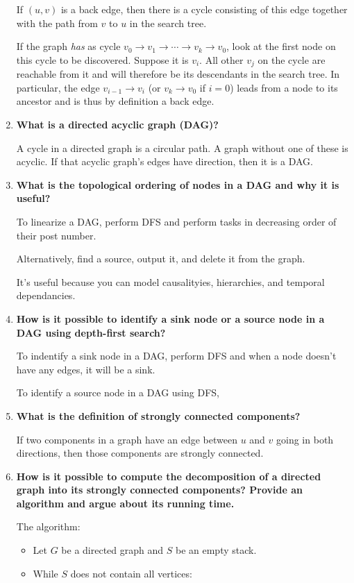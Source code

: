 \documentclass[a4paper,11pt]{article}
\begin{document}
\begin{enumerate}
  If $(u, v)$ is a back edge, then there is a cycle consisting of this
  edge together with the path from $v$ to $u$ in the search tree.

  If the graph \emph{has} as cycle
  $v_0 \to v_1 \to \cdots \to v_k \to v_0$, look at the first node on
  this cycle to be discovered. Suppose it is $v_i$. All other $v_j$ on
  the cycle are reachable from it and will therefore be its descendants
  in the search tree. In particular, the edge $v_{i - 1} \to v_i$ (or
  $v_k \to v_0$ if $i = 0$) leads from a node to its ancestor and is
  thus by definition a back edge.
\item
  \textbf{What is a directed acyclic graph (DAG)?}

  A cycle in a directed graph is a circular path. A graph without one of
  these is acyclic. If that acyclic graph's edges have direction, then
  it is a DAG.
\item
  \textbf{What is the topological ordering of nodes in a DAG and why it
  is useful?}

  To linearize a DAG, perform DFS and perform tasks in decreasing order
  of their post number.

  Alternatively, find a source, output it, and delete it from the graph.

  It's useful because you can model causalityies, hierarchies, and
  temporal dependancies.
\item
  \textbf{How is it possible to identify a sink node or a source node in
  a DAG using depth-first search?}

  To indentify a sink node in a DAG, perform DFS and when a node doesn't
  have any edges, it will be a sink.

  To identify a source node in a DAG using DFS,
\item
  \textbf{What is the definition of strongly connected components?}

  If two components in a graph have an edge between $u$ and $v$ going in
  both directions, then those components are strongly connected.
\item
  \textbf{How is it possible to compute the decomposition of a directed
  graph into its strongly connected components? Provide an algorithm and
  argue about its running time.}

  The algorithm:

  \begin{itemize}
  \itemsep1pt\parskip0pt
  \item
    Let $G$ be a directed graph and $S$ be an empty stack.
  \item
    While $S$ does not contain all vertices:


\end{itemize}
\end{enumerate}
\end{document}
